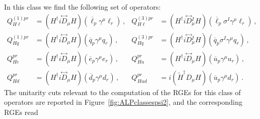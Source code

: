 In this class we find the following set of operators:
\begin{align}
Q_{H\ell}^{(1)pr} &= (H^\dagger i \overset{\leftrightarrow}{D}_\mu H)(\overline{\ell}_p \gamma^\mu \ell_r)\,,  &Q_{H \ell}^{(3)pr} &= (H^\dagger i \overset{\leftrightarrow}{D}{}^I_\mu H)(\overline{\ell}_p \sigma^I \gamma^\mu \ell_r) \,, \\
Q_{Hq}^{(1)pr} &= (H^\dagger i \overset{\leftrightarrow}{D}_\mu H)(\overline{q}_p \gamma^\mu q_r)\,,  &Q_{Hq}^{(3)pr} &= (H^\dagger i \overset{\leftrightarrow}{D}{}^I_\mu H)(\overline{q}_p \sigma^I \gamma^\mu q_r)\,, \\
Q_{He}^{pr} &= (H^\dagger i \overset{\leftrightarrow}{D}_\mu H)(\overline{e}_p \gamma^\mu e_r)\,,  &Q_{Hu}^{pr} &= (H^\dagger i \overset{\leftrightarrow}{D}_\mu H)(\overline{u}_p  \gamma^\mu u_r)\,, \\
Q_{Hd}^{pr} &= (H^\dagger i \overset{\leftrightarrow}{D}_\mu H)(\overline{d}_p \gamma^\mu d_r)\,,  &Q_{Hud}^{pr} &= i(\widetilde{H}^\dagger D_\mu H)(\overline{u}_p  \gamma^\mu d_r) \,.
\end{align}
The unitarity cuts relevant to the computation of the RGEs for this class of operators are
reported in Figure~\ref{fig:ALPclassespsi2}, and the corresponding RGEs read
